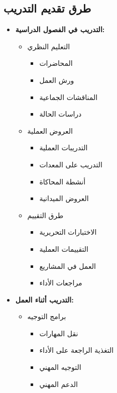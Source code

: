 \subsection{طرق تقديم التدريب}
\begin{itemize}
    \item \textbf{التدريب في الفصول الدراسية:}
    \begin{itemize}
        \item التعليم النظري
        \begin{itemize}
            \item المحاضرات
            \item ورش العمل
            \item المناقشات الجماعية
            \item دراسات الحالة
        \end{itemize}
        
        \item العروض العملية
        \begin{itemize}
            \item التدريبات العملية
            \item التدريب على المعدات
            \item أنشطة المحاكاة
            \item العروض الميدانية
        \end{itemize}
        
        \item طرق التقييم
        \begin{itemize}
            \item الاختبارات التحريرية
            \item التقييمات العملية
            \item العمل في المشاريع
            \item مراجعات الأداء
        \end{itemize}
    \end{itemize}
    
    \item \textbf{التدريب أثناء العمل:}
    \begin{itemize}
        \item برامج التوجيه
        \begin{itemize}
            \item نقل المهارات
            \item التغذية الراجعة على الأداء
            \item التوجيه المهني
            \item الدعم المهني
        \end{itemize}
        

\end{itemize}
\end{itemize}

